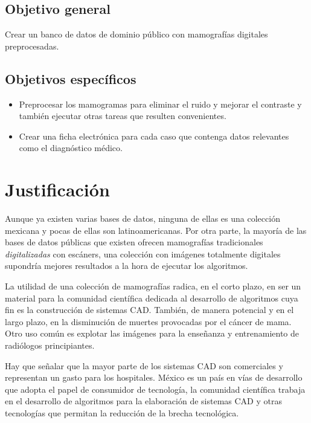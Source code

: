 \subsection{Objetivo general}

Crear un banco de datos de dominio público con mamografías digitales
preprocesadas.

\subsection{Objetivos específicos}

\begin{itemize}
    \item Preprocesar los mamogramas para eliminar el ruido y mejorar el
    contraste y también ejecutar otras tareas que resulten convenientes.
    \item Crear una ficha electrónica para cada caso que contenga datos
    relevantes como el diagnóstico médico.
\end{itemize}

\section{Justificación}

Aunque ya existen varias bases de datos, ninguna de ellas es una colección
mexicana y pocas de ellas son latinoamericanas. Por otra parte, la mayoría de
las bases de datos públicas que existen ofrecen mamografías tradicionales
\textit{digitalizadas} con escáners, una colección con imágenes totalmente
digitales supondría mejores resultados a la hora de ejecutar los algoritmos.

La utilidad de una colección de mamografías radica, en el corto plazo, en ser
un material para la comunidad científica dedicada al desarrollo de algoritmos
cuya fin es la construcción de sistemas CAD. También, de manera potencial y en
el largo plazo, en la disminución de muertes provocadas por el cáncer de mama.
Otro uso común es explotar las imágenes para la enseñanza y entrenamiento
de radiólogos principiantes.

Hay que señalar que la mayor parte de los sistemas CAD son comerciales y
representan un gasto para los hospitales. México es un país en vías de
desarrollo que adopta el papel de consumidor de tecnología, la
comunidad científica trabaja en el desarrollo de algoritmos para la elaboración
de sistemas CAD y otras tecnologías que permitan la reducción de la brecha
tecnológica.

